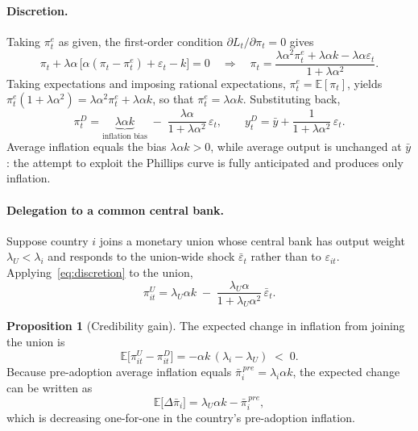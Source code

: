 \documentclass[11pt,a4paper]{article}
\numberwithin{equation}{section}
\theoremstyle{definition}
\newtheorem{proposition}{Proposition}
\theoremstyle{remark}
\begin{document}
\paragraph{Discretion.} Taking $\pi_t^e$ as given, the first-order condition $\partial L_t/\partial \pi_t = 0$ gives
\begin{equation}
\pi_t + \lambda\alpha\,\big[\alpha(\pi_t-\pi^e_t) + \varepsilon_t - k\big] = 0
\quad\Longrightarrow\quad
\pi_t = \frac{\lambda\alpha^2\pi_t^e + \lambda\alpha k - \lambda\alpha\varepsilon_t}{1+\lambda\alpha^2}.
\label{eq:foc}
\end{equation}
Taking expectations and imposing rational expectations, $\pi_t^e = \mathbb{E}[\pi_t]$, yields $\pi^e_t(1+\lambda\alpha^2) = \lambda\alpha^2\pi^e_t + \lambda\alpha k$, so that $\pi^e_t = \lambda\alpha k$. Substituting back,
\begin{equation}
\pi_t^{D} = \underbrace{\lambda\alpha k}_{\text{inflation bias}} \;-\; \frac{\lambda\alpha}{1+\lambda\alpha^2}\,\varepsilon_t,
\qquad
y_t^{D} = \bar{y} + \frac{1}{1+\lambda\alpha^2}\,\varepsilon_t.
\label{eq:discretion}
\end{equation}
Average inflation equals the bias $\lambda\alpha k>0$, while average output is unchanged at $\bar{y}$: the attempt to exploit the Phillips curve is fully anticipated and produces only inflation.

\paragraph{Delegation to a common central bank.} Suppose country $i$ joins a monetary union whose central bank has output weight $\lambda_U < \lambda_i$ and responds to the union-wide shock $\bar{\varepsilon}_t$ rather than to $\varepsilon_{it}$. Applying~\eqref{eq:discretion} to the union,
\begin{equation}
\pi_{it}^{U} = \lambda_U\alpha k \;-\; \frac{\lambda_U\alpha}{1+\lambda_U\alpha^2}\,\bar{\varepsilon}_t.
\label{eq:union}
\end{equation}

\begin{proposition}[Credibility gain]\label{prop:gain}
The expected change in inflation from joining the union is
\begin{equation}
\mathbb{E}\big[\pi^{U}_{it} - \pi^{D}_{it}\big] = -\alpha k\,(\lambda_i - \lambda_U) \;<\; 0 .
\label{eq:gain}
\end{equation}
Because pre-adoption average inflation equals $\bar{\pi}_i^{\,pre}=\lambda_i\alpha k$, the expected change can be written as
\begin{equation}
\mathbb{E}\big[\Delta\bar{\pi}_i\big] = \lambda_U\alpha k - \bar{\pi}_i^{\,pre},
\label{eq:gain2}
\end{equation}
which is decreasing one-for-one in the country's pre-adoption inflation.
\end{proposition}
\end{document}
